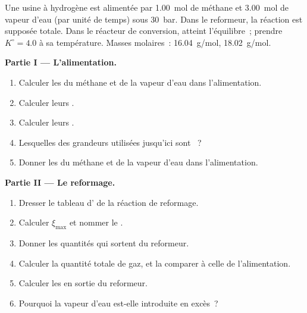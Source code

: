 \begin{problem}
\label{pb:b1:extent-q-and-k:1}
Une usine à hydrogène est alimentée par \qty{1.00}{mol} de méthane et
\qty{3.00}{mol} de vapeur d'eau (par unité de temps) sous
\qty{30}{bar}. Dans le reformeur, la réaction 
est supposée totale. Dans le réacteur de conversion,
 atteint l'équilibre~; prendre $K^\circ =
4.0$ à sa température. Masses molaires~:  \qty{16.04}{g/mol},
 \qty{18.02}{g/mol}.

\medskip
\noindent\textbf{Partie I --- L'alimentation.}
\begin{enumerate}
  \item Calculer les  du méthane et de la vapeur d'eau
        dans l'alimentation.
  \item Calculer leurs .
  \item Calculer leurs .
  \item Lesquelles des grandeurs utilisées jusqu'ici sont ~?
  \item Donner les  du méthane et de la vapeur d'eau dans
        l'alimentation.
\end{enumerate}

\medskip
\noindent\textbf{Partie II --- Le reformage.}
\begin{enumerate}[resume]
  \item Dresser le tableau d' de la réaction de reformage.
  \item Calculer $\xi_{\max}$ et nommer le .
  \item Donner les quantités qui sortent du reformeur.
  \item Calculer la quantité totale de gaz, et la comparer à celle de
        l'alimentation.
  \item Calculer les  en sortie du reformeur.
  \item Pourquoi la vapeur d'eau est-elle introduite en excès~?
\end{enumerate}


\end{problem}
